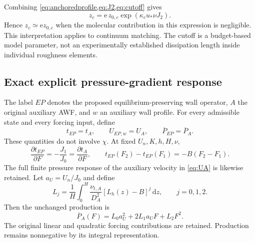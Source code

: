 \documentclass[11pt,a4paper]{article}
\numberwithin{equation}{section}
\newcommand{\dd}{\mathrm{d}}
\newcommand{\ee}{\mathrm{e}}
\newcommand{\ust}{u_*}
\newcommand{\kc}{\kappa_c}
\newcommand{\avg}[1]{\overline{#1}}
\newcommand{\ycut}{z_c}
\begin{document}
Combining \cref{eq:anchoredprofile,eq:J2,eq:cutoff} gives
\begin{equation}
 \boxed{\ycut=\ee\,z_{0,c}\exp(\kc\ust\nu J_2).}
 \label{eq:cutoffroughness}
\end{equation}
Hence $\ycut\simeq\ee z_{0,c}$ when the molecular contribution in this
expression is negligible. This interpretation applies to continuum
matching. The cutoff is a budget-based model parameter, not an
experimentally established dissipation length inside individual roughness
elements.

\subsection{Exact explicit pressure-gradient response}
The label $EP$ denotes the proposed equilibrium-preserving wall
operator, $A$ the original auxiliary AWF, and $w$ an auxiliary wall
profile. For every admissible state and every forcing input, define
\begin{equation}
 \boxed{
 t_{EP}=t_A,\qquad U_{EP,w}=U_A,\qquad
 \avg P_{EP}=\avg P_A.}
 \label{eq:retained}
\end{equation}
These quantities do not involve $\chi$. At fixed $U_n,K,h,H,\nu$,
\begin{equation}
 \frac{\partial t_{EP}}{\partial F}
 =-\frac{J_1}{J_0}
 =\frac{\partial t_A}{\partial F},
 \qquad
 t_{EP}(F_2)-t_{EP}(F_1)=-B(F_2-F_1).
 \label{eq:pressureresponse}
\end{equation}
The full finite pressure response of the auxiliary velocity in
\cref{eq:UA} is likewise retained.
Let $a_U=U_n/J_0$ and define
\begin{equation}
 L_j=\frac1H\int_0^H
 \frac{\nu_{t,A}}{D_A^2}[L_h(z)-B]^j\,\dd z,\qquad j=0,1,2.
 \label{eq:Lj}
\end{equation}
Then the unchanged production is
\begin{equation}
 \avg P_A(F)=L_0a_U^2+2L_1a_UF+L_2F^2.
 \label{eq:Ppoly}
\end{equation}
The original linear and quadratic forcing contributions are retained.
Production remains nonnegative by its integral representation.
\end{document}
